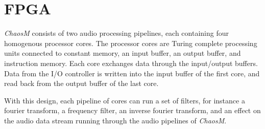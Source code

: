 \FloatBarrier
\section{FPGA}\label{chapter:fpga}

\textit{ChaosM} consists of two audio processing pipelines, each containing four
homogenous processor cores. The processor cores are Turing complete processing
units connected to constant memory, an input buffer, an output buffer, and
instruction memory. Each core exchanges data through the input/output buffers.
Data from the I/O controller is written into the input buffer of the first core, and read
back from the output buffer of the last core.

With this design, each pipeline of cores can run a set of filters, for instance
a fourier transform, a frequency filter, an inverse fourier transform, and an
effect on the audio data stream running through the audio pipelines of \textit{ChaosM}.








